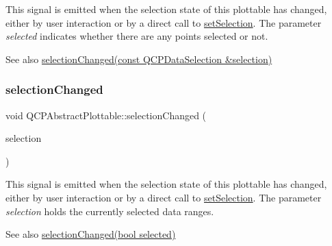 This signal is emitted when the selection state of this plottable has changed, either by user interaction or by a direct call to \hyperlink{class_q_c_p_abstract_plottable_a219bc5403a9d85d3129165ec3f5ae436}{set\+Selection}. The parameter {\itshape selected} indicates whether there are any points selected or not.

\begin{DoxySeeAlso}{See also}
\hyperlink{class_q_c_p_abstract_plottable_a787a9c39421059006891744b731fa473}{selection\+Changed(const Q\+C\+P\+Data\+Selection \&selection)} 
\end{DoxySeeAlso}
\mbox{\label{class_q_c_p_abstract_plottable_a787a9c39421059006891744b731fa473}} 
\subsubsection{\texorpdfstring{selection\+Changed}{selectionChanged}\hspace{0.1cm}{\footnotesize\ttfamily [2/2]}}
{\footnotesize\ttfamily void Q\+C\+P\+Abstract\+Plottable\+::selection\+Changed (\begin{DoxyParamCaption}\item[{const \hyperlink{class_q_c_p_data_selection}{Q\+C\+P\+Data\+Selection} \&}]{selection }\end{DoxyParamCaption})\hspace{0.3cm}{\ttfamily [signal]}}

This signal is emitted when the selection state of this plottable has changed, either by user interaction or by a direct call to \hyperlink{class_q_c_p_abstract_plottable_a219bc5403a9d85d3129165ec3f5ae436}{set\+Selection}. The parameter {\itshape selection} holds the currently selected data ranges.

\begin{DoxySeeAlso}{See also}
\hyperlink{class_q_c_p_abstract_plottable_a3af66432b1dca93b28e00e78a8c7c1d9}{selection\+Changed(bool selected)} 
\end{DoxySeeAlso}
\mbox{\label{class_q_c_p_abstract_plottable_a7861518e47ca0c6a0c386032c2db075e}} 

